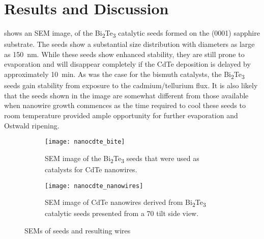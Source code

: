 \section{Results and Discussion}
 shows an SEM image, of the Bi\textsubscript{2}Te\textsubscript{3} catalytic seeds formed on the (0001) sapphire substrate.
The seeds show a substantial size distribution with diameters as large as 150~nm.
While these seeds show enhanced stability, they are still prone to evaporation and will disappear completely if the CdTe deposition is delayed by approximately 10~min.
As was the case for the bismuth catalysts, the Bi\textsubscript{2}Te\textsubscript{3} seeds gain stability from exposure to the cadmium/tellurium flux.
It is also likely that the seeds shown in the image are somewhat different from those available when nanowire growth commences as the time required to cool these seeds to room temperature provided ample opportunity for further evaporation and Ostwald ripening.
\begin{figure}
 \centering
 \begin{subfigure}[t]{0.5\textwidth}
  \centering \texttt{[image: nanocdte\_bite]}
  \caption{\label{fig:nanocdte_bite}SEM image of the Bi\textsubscript{2}Te\textsubscript{3} seeds that were used as catalysts for CdTe nanowires.}
 \end{subfigure}%
 \begin{subfigure}[t]{0.5\textwidth}
  \centering \texttt{[image: nanocdte\_nanowires]}
  \caption{\label{fig:nanocdte_nanowires} SEM image of CdTe nanowires derived from Bi\textsubscript{2}Te\textsubscript{3} catalytic seeds presented from a 70\degree{} tilt side view.}
 \end{subfigure}
 \caption{\label{fig:nanocdte_sem}SEMs of seeds and resulting wires}
\end{figure}

